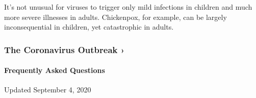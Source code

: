 It's not unusual for viruses to trigger only mild infections in children
and much more severe illnesses in adults. Chickenpox, for example, can
be largely inconsequential in children, yet catastrophic in adults.

\href{https://www.nytimes3xbfgragh.onion/news-event/coronavirus?action=click\&pgtype=Article\&state=default\&region=MAIN_CONTENT_3\&context=storylines_faq}{}

\hypertarget{the-coronavirus-outbreak-}{%
\subsubsection{The Coronavirus Outbreak
›}\label{the-coronavirus-outbreak-}}

\hypertarget{frequently-asked-questions}{%
\paragraph{Frequently Asked
Questions}\label{frequently-asked-questions}}

Updated September 4, 2020


